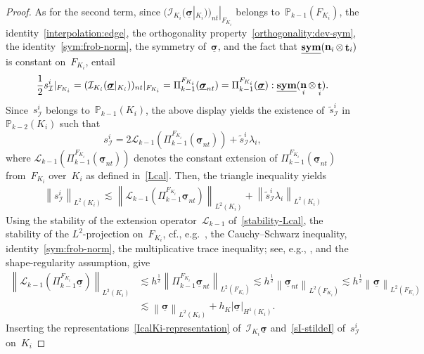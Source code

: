 \documentclass[a4paper,twoside,10pt]{article}
\theoremstyle{plain}
\theoremstyle{remark}
\theoremstyle{definition}
\numberwithin{equation}{section}
\numberwithin{figure}{section}
\newcommand{\Norm}[1]{{\left\|{#1} \right\|}}
\newcommand{\SemiNorm}[1]{{\left|{#1} \right|}}
\newcommand{\Pbbkmo}{\mathbb{P}_{k-1}}
\newcommand{\Pbbkmt}{\mathbb{P}_{k-2}}
\newcommand{\K}{K}
\newcommand{\F}{F}
\newcommand{\sigmabf}{\underline{\boldsymbol{\sigma}}}
\newcommand{\normtang}{{nt}}
\newcommand{\sym}{\underline{\bf{sym}}}
\DeclareMathOperator{\norm}{\bf{n}}
\DeclareMathOperator{\tang}{\bf{t}}
\newcommand{\Ltwo}{L^2}
\newcommand{\lambdai}{\lambda_i}
\newcommand{\Ki}{{\K_i}}
\newcommand{\Fi}{{\F_{\Ki}}}
\newcommand{\normi}{\norm_i}
\newcommand{\tangi}{\tang_i}
\newcommand{\hK}{h_\K}
\newcommand{\IcalKi}{\mathcal{I}_{\Ki}}
\newcommand{\sIi}{s_{\mathcal{I}}^i}
\newcommand{\PikmoFi}{\Pi_{k-1}^{\Fi}}
\newcommand{\Lcalkmo}{\mathcal{L}_{k-1}}
\newcommand{\stildeIi}{\tilde{s}^i_{\mathcal{I}}}
\begin{document}
\begin{proof}
As for the second term,
since $(\IcalKi(\sigmabf|_{\Ki}) )_{\normtang}|_{\Fi}$
belongs to~$\Pbbkmo(\Fi)$,
the identity~\eqref{interpolation:edge},
the orthogonality property~\eqref{orthogonality:dev-sym},
the identity~\eqref{sym:frob-norm},
the symmetry of~$\sigmabf$,
and the fact that $\sym(\normi\otimes\tangi)$ is constant on~$\Fi$,
entail
\begin{equation} \label{sI-value-on-edge}
\frac{1}{2}\sIi|_{\Fi}
= (\IcalKi(\sigmabf|_{\Ki}))_{\normtang}|_{\Fi}
= \PikmoFi(\sigmabf_{\normtang})
=  \PikmoFi(\sigmabf):\sym(\normi\otimes\tangi).
\end{equation}
Since~$\sIi$ belongs to~$\Pbbkmo(\Ki)$,
the above display yields the existence of~$\stildeIi$ in~$\Pbbkmt(\Ki)$
such that
\begin{equation} \label{sI-stildeI}
\sIi = 2\Lcalkmo(\PikmoFi(\sigmabf_{\normtang})) + \stildeIi\lambdai,
\end{equation}
where
$\Lcalkmo(\PikmoFi(\sigmabf_{\normtang}))$ denotes
the constant extension of $\PikmoFi(\sigmabf_{\normtang})$ from~$\Fi$ over~$\Ki$
as defined in~\eqref{Lcal}.
Then,
the triangle inequality yields
\begin{equation} \label{triangle-sIi}
\begin{split}
\Norm{\sIi}_{\Ltwo(\Ki)}
\lesssim \Norm{\Lcalkmo(\PikmoFi\sigmabf_{\normtang})}_{\Ltwo(\Ki)}
    +\Norm{\stildeIi\lambdai}_{\Ltwo(\Ki)}
\end{split}
\end{equation}
Using the stability of the extension operator~$\Lcalkmo$ of~\eqref{stability-Lcal},
the stability of the $\Ltwo$-projection on~$\Fi$, cf., e.g.~\cite[Thm.~18.16]{Ern-Guermond:1}, 
the Cauchy--Schwarz inequality,
identity~\eqref{sym:frob-norm},
the multiplicative trace inequality; see, e.g., \cite[Lem.~12.15]{Ern-Guermond:1},
and the shape-regularity assumption,
give
\begin{equation} \label{Lcal-estimate}
\begin{split}
\Norm{\Lcalkmo(\PikmoFi\sigmabf)}_{\Ltwo(\Ki)}
&\lesssim h^{\frac12}\Norm{\PikmoFi\sigmabf_{\normtang}}_{\Ltwo(\Fi)} 
\lesssim h^{\frac12}\Norm{\sigmabf_{\normtang}}_{\Ltwo(\Fi)}
\lesssim h^{\frac12}\Norm{\sigmabf}_{\Ltwo(\Fi)} \\
&\lesssim \Norm{\sigmabf}_{\Ltwo(\Ki)} + \hK\SemiNorm{\sigmabf}_{H^1(\Ki)}.
\end{split}
\end{equation}
Inserting the representations~\eqref{IcalKi-representation} of~$\IcalKi\sigmabf$
and~\eqref{sI-stildeI} of~$\sIi$ on~$\Ki$

\end{proof}
\end{document}
